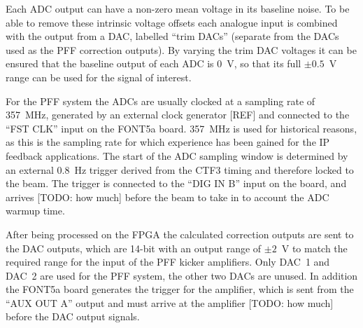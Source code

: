 Each ADC output can have a non-zero mean voltage in its baseline noise. To be able to remove these intrinsic voltage offsets each analogue input is combined with the output from a DAC, labelled ``trim DACs'' (separate from the DACs used as the PFF correction outputs). By varying the trim DAC voltages it can be ensured that the baseline output of each ADC is 0~V, so that its full \(\pm0.5\)~V range can be used for the signal of interest.

For the PFF system the ADCs are usually clocked at a sampling rate of 357~MHz, generated by an external clock generator [REF] and connected to the ``FST CLK'' input on the FONT5a board. 357~MHz is used for historical reasons, as this is the sampling rate for which experience has been gained for the IP feedback applications. The start of the ADC sampling window is determined by an external 0.8~Hz trigger derived from the CTF3 timing and therefore locked to the beam. The trigger is connected to the ``DIG IN B'' input on the board, and arrives [TODO: how much] before the beam to take in to account the ADC warmup time.

After being processed on the FPGA the calculated correction outputs are sent to the DAC outputs, which are 14-bit with an output range of \(\pm2\)~V to match the required range for the input of the PFF kicker amplifiers. Only DAC~1 and DAC~2 are used for the PFF system, the other two DACs are unused. In addition the FONT5a board generates the trigger for the amplifier, which is sent from the ``AUX OUT A'' output and must arrive at the amplifier [TODO: how much] before the DAC output signals.

